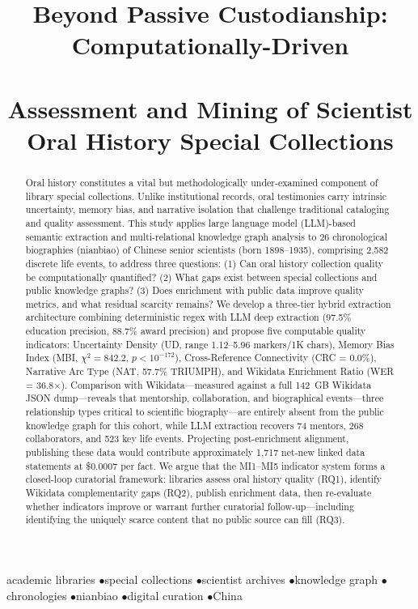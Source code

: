 \documentclass[review]{elsarticle}
\begin{document}
\begin{frontmatter}

\title{Beyond Passive Custodianship: Computationally-Driven\\\\
       Assessment and Mining of Scientist Oral History Special Collections}

\begin{abstract}
Oral history constitutes a vital but methodologically under-examined component of library special collections. Unlike institutional records, oral testimonies carry intrinsic uncertainty, memory bias, and narrative isolation that challenge traditional cataloging and quality assessment. This study applies large language model (LLM)-based semantic extraction and multi-relational knowledge graph analysis to 26 chronological biographies (nianbiao) of Chinese senior scientists (born 1898--1935), comprising 2,582 discrete life events, to address three questions: (1) Can oral history collection quality be computationally quantified? (2) What gaps exist between special collections and public knowledge graphs? (3) Does enrichment with public data improve quality metrics, and what residual scarcity remains? We develop a three-tier hybrid extraction architecture combining deterministic regex with LLM deep extraction (97.5\% education precision, 88.7\% award precision) and propose five computable quality indicators: Uncertainty Density (UD, range 1.12--5.96 markers/1K chars), Memory Bias Index (MBI, $\chi^2 = 842.2$, $p < 10^{-172}$), Cross-Reference Connectivity (CRC = 0.0\%), Narrative Arc Type (NAT, 57.7\% TRIUMPH), and Wikidata Enrichment Ratio (WER = 36.8$\times$). Comparison with Wikidata—measured against a full 142~GB Wikidata JSON dump—reveals that mentorship, collaboration, and biographical events—three relationship types critical to scientific biography—are entirely absent from the public knowledge graph for this cohort, while LLM extraction recovers 74 mentors, 268 collaborators, and 523 key life events. Projecting post-enrichment alignment, publishing these data would contribute approximately 1,717 net-new linked data statements at \$0.0007 per fact. We argue that the MI1--MI5 indicator system forms a closed-loop curatorial framework: libraries assess oral history quality (RQ1), identify Wikidata complementarity gaps (RQ2), publish enrichment data, then re-evaluate whether indicators improve or warrant further curatorial follow-up—including identifying the uniquely scarce content that no public source can fill (RQ3).
\end{abstract}

\begin{keyword}
academic libraries \enspace$\bullet$\enspace special collections \enspace$\bullet$\enspace scientist archives \enspace$\bullet$\enspace knowledge graph \enspace$\bullet$\enspace chronologies \enspace$\bullet$\enspace nianbiao \enspace$\bullet$\enspace digital curation \enspace$\bullet$\enspace China
\end{keyword}

\end{frontmatter}
\end{document}
